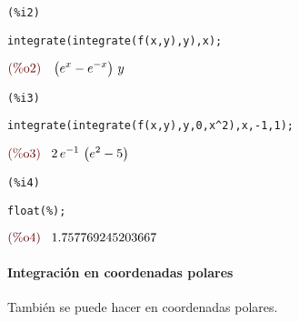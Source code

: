 \documentclass[12pt]{article}
\begin{document}
\noindent
\begin{minipage}[t]{8ex}{\color{red}\bf
\begin{verbatim}
(%i2) 
\end{verbatim}}
\end{minipage}
\begin{minipage}[t]{\textwidth}{\color{blue}
\begin{verbatim}
integrate(integrate(f(x,y),y),x);
\end{verbatim}}
\end{minipage}
\begin{math}\displaystyle
\parbox{8ex}{\color{labelcolor}(\%o2) }
\left( {e}^{x}-{e}^{-x}\right) \,y
\end{math}


\noindent
\begin{minipage}[t]{8ex}{\color{red}\bf
\begin{verbatim}
(%i3) 
\end{verbatim}}
\end{minipage}
\begin{minipage}[t]{\textwidth}{\color{blue}
\begin{verbatim}
integrate(integrate(f(x,y),y,0,x^2),x,-1,1);
\end{verbatim}}
\end{minipage}
\begin{math}\displaystyle
\parbox{8ex}{\color{labelcolor}(\%o3) }
2\,{e}^{-1}\,\left( {e}^{2}-5\right) 
\end{math}


\noindent
\begin{minipage}[t]{8ex}{\color{red}\bf
\begin{verbatim}
(%i4) 
\end{verbatim}}
\end{minipage}
\begin{minipage}[t]{\textwidth}{\color{blue}
\begin{verbatim}
float(%);
\end{verbatim}}
\end{minipage}
\begin{math}\displaystyle
\parbox{8ex}{\color{labelcolor}(\%o4) }
1.757769245203667
\end{math}

\paragraph{Integración en coordenadas polares} También se puede hacer en coordenadas polares.
\end{document}
